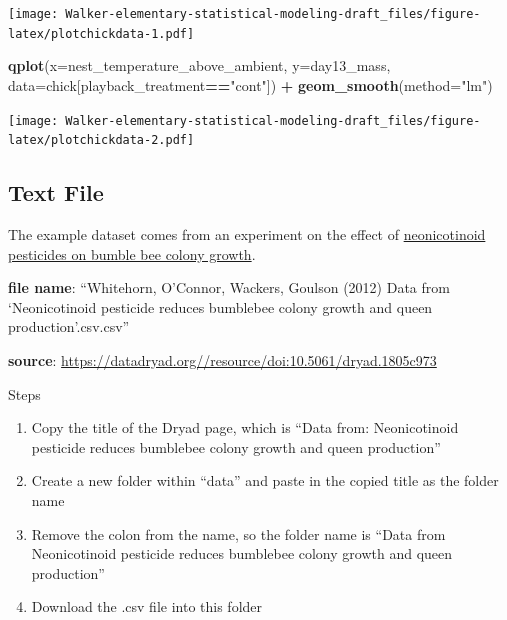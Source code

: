 \documentclass[]{book}
\newenvironment{Shaded}{\begin{snugshade}}{\end{snugshade}}
\newcommand{\KeywordTok}[1]{\textcolor[rgb]{0.13,0.29,0.53}{\textbf{#1}}}
\newcommand{\DataTypeTok}[1]{\textcolor[rgb]{0.13,0.29,0.53}{#1}}
\newcommand{\StringTok}[1]{\textcolor[rgb]{0.31,0.60,0.02}{#1}}
\newcommand{\OperatorTok}[1]{\textcolor[rgb]{0.81,0.36,0.00}{\textbf{#1}}}
\newcommand{\NormalTok}[1]{#1}
\providecommand{\tightlist}{%
  \setlength{\itemsep}{0pt}\setlength{\parskip}{0pt}}
\theoremstyle{definition}
\theoremstyle{definition}
\theoremstyle{definition}
\theoremstyle{remark}
\begin{document}
\texttt{[image: Walker-elementary-statistical-modeling-draft\_files/figure-latex/plotchickdata-1.pdf]}

\begin{Shaded}
\begin{Highlighting}[]
\KeywordTok{qplot}\NormalTok{(}\DataTypeTok{x=}\NormalTok{nest_temperature_above_ambient, }\DataTypeTok{y=}\NormalTok{day13_mass, }\DataTypeTok{data=}\NormalTok{chick[playback_treatment}\OperatorTok{==}\StringTok{"cont"}\NormalTok{]) }\OperatorTok{+}
\StringTok{  }\KeywordTok{geom_smooth}\NormalTok{(}\DataTypeTok{method=}\StringTok{"lm"}\NormalTok{)}
\end{Highlighting}
\end{Shaded}

\texttt{[image: Walker-elementary-statistical-modeling-draft\_files/figure-latex/plotchickdata-2.pdf]}

\subsection{Text File}\label{text-file}

The example dataset comes from an experiment on the effect of
\href{http://science.sciencemag.org/content/early/2012/03/28/science.1215025}{neonicotinoid
pesticides on bumble bee colony growth}.

\textbf{file name}: ``Whitehorn, O'Connor, Wackers, Goulson (2012) Data
from `Neonicotinoid pesticide reduces bumblebee colony growth and queen
production'.csv.csv''

\textbf{source}:
\url{https://datadryad.org//resource/doi:10.5061/dryad.1805c973}

Steps

\begin{enumerate}
\def\labelenumi{\arabic{enumi}.}
\tightlist
\item
  Copy the title of the Dryad page, which is ``Data from: Neonicotinoid
  pesticide reduces bumblebee colony growth and queen production''
\item
  Create a new folder within ``data'' and paste in the copied title as
  the folder name
\item
  Remove the colon from the name, so the folder name is ``Data from
  Neonicotinoid pesticide reduces bumblebee colony growth and queen
  production''
\item
  Download the .csv file into this folder
\end{enumerate}
\end{document}
